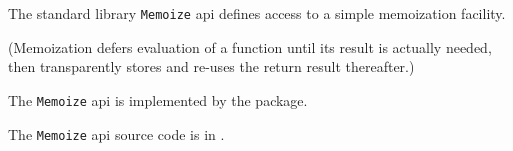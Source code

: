 
The standard library {\tt Memoize} api defines access to a simple memoization facility.

(Memoization defers evaluation of a function until its result is actually needed,
then transparently stores and re-uses the return result thereafter.)

The {\tt Memoize} api is implemented by the  package.

The {\tt Memoize} api source code is in .



